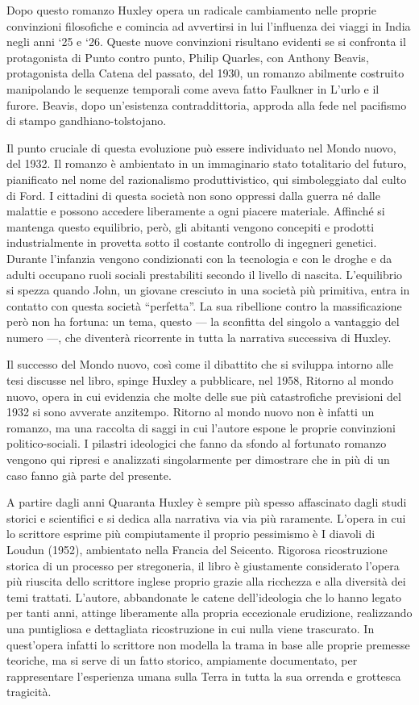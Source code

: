 \documentclass[
a5paper, %
10pt, %
twoside, 
onecolumn, %
openany, %
]{memoir}
\begin{document}
Dopo questo romanzo Huxley opera un radicale cambiamento nelle proprie convinzioni filosofiche e comincia ad avvertirsi in lui l’influenza dei viaggi in India negli anni ‘25 e ‘26. Queste nuove convinzioni risultano evidenti se si confronta il protagonista di Punto contro punto, Philip Quarles, con Anthony Beavis, protagonista della Catena del passato, del 1930, un romanzo abilmente costruito manipolando le sequenze temporali come aveva fatto Faulkner in L’urlo e il furore. Beavis, dopo un’esistenza contraddittoria, approda alla fede nel pacifismo di stampo gandhiano-tolstojano.

Il punto cruciale di questa evoluzione può essere individuato nel Mondo nuovo, del 1932. Il romanzo è ambientato in un immaginario stato totalitario del futuro, pianificato nel nome del razionalismo produttivistico, qui simboleggiato dal culto di Ford. I cittadini di questa società non sono oppressi dalla guerra né dalle malattie e possono accedere liberamente a ogni piacere materiale. Affinché si mantenga questo equilibrio, però, gli abitanti vengono concepiti e prodotti industrialmente in provetta sotto il costante controllo di ingegneri genetici. Durante l’infanzia vengono condizionati con la tecnologia e con le droghe e da adulti occupano ruoli sociali prestabiliti secondo il livello di nascita. L’equilibrio si spezza quando John, un giovane cresciuto in una società più primitiva, entra in contatto con questa società “perfetta”. La sua ribellione contro la massificazione però non ha fortuna: un tema, questo — la sconfitta del singolo a vantaggio del numero —, che diventerà ricorrente in tutta la narrativa successiva di Huxley.

Il successo del Mondo nuovo, così come il dibattito che si sviluppa intorno alle tesi discusse nel libro, spinge Huxley a pubblicare, nel 1958, Ritorno al mondo nuovo, opera in cui evidenzia che molte delle sue più catastrofiche previsioni del 1932 si sono avverate anzitempo. Ritorno al mondo nuovo non è infatti un romanzo, ma una raccolta di saggi in cui l’autore espone le proprie convinzioni politico-sociali. I pilastri ideologici che fanno da sfondo al fortunato romanzo vengono qui ripresi e analizzati singolarmente per dimostrare che in più di un caso fanno già parte del presente.

A partire dagli anni Quaranta Huxley è sempre più spesso affascinato dagli studi storici e scientifici e si dedica alla narrativa via via più raramente. L’opera in cui lo scrittore esprime più compiutamente il proprio pessimismo è I diavoli di Loudun (1952), ambientato nella Francia del Seicento. Rigorosa ricostruzione storica di un processo per stregoneria, il libro è giustamente considerato l’opera più riuscita dello scrittore inglese proprio grazie alla ricchezza e alla diversità dei temi trattati. L’autore, abbandonate le catene dell’ideologia che lo hanno legato per tanti anni, attinge liberamente alla propria eccezionale erudizione, realizzando una puntigliosa e dettagliata ricostruzione in cui nulla viene trascurato. In quest’opera infatti lo scrittore non modella la trama in base alle proprie premesse teoriche, ma si serve di un fatto storico, ampiamente documentato, per rappresentare l’esperienza umana sulla Terra in tutta la sua orrenda e grottesca tragicità.
\end{document}
